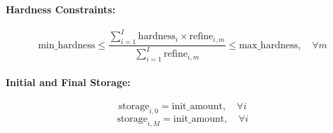 \documentclass{article}
\begin{document}
\paragraph{Hardness Constraints:}
\[
\text{min\_hardness} \leq \frac{\sum_{i=1}^{I} \text{hardness}_{i} \times \text{refine}_{i,m}}{\sum_{i=1}^{I} \text{refine}_{i,m}} \leq \text{max\_hardness}, \quad \forall m
\]

\paragraph{Initial and Final Storage:}
\[
\text{storage}_{i,0} = \text{init\_amount}, \quad \forall i
\]
\[
\text{storage}_{i,M} = \text{init\_amount}, \quad \forall i
\]
\end{document}
